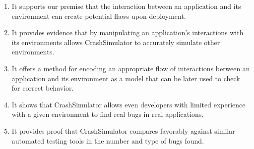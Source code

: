 \begin{enumerate}

\item{It supports our premise that the interaction between an application
and its environment can create potential flaws upon deployment.}

\item{It provides evidence that by manipulating
an application's interactions with its environments allows CrashSimulator to
accurately simulate other environments.}

\item{It offers a method for encoding an appropriate flow of
interactions between an application and its environment as a model that
can be later used to check for correct behavior.}

\item{It shows that CrashSimulator allows even developers with limited
experience with a given environment to find real bugs in
real applications.}

\item{It provides proof that CrashSimulator compares favorably against
similar automated testing tools in the number and type of bugs found.}

\end{enumerate}
